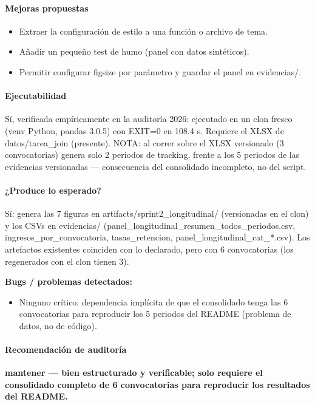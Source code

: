 \paragraph{Mejoras propuestas}
\begin{itemize}
  \item Extraer la configuración de estilo a una función o archivo de tema.
  \item Añadir un pequeño test de humo (panel con datos sintéticos).
  \item Permitir configurar figsize por parámetro y guardar el panel en evidencias/.
\end{itemize}

\paragraph{Ejecutabilidad}
Sí, verificada empíricamente en la auditoría 2026: ejecutado en un clon fresco (venv Python, pandas 3.0.5) con EXIT=0 en 108.4 s. Requiere el XLSX de datos/tarea\_join (presente). NOTA: al correr sobre el XLSX versionado (3 convocatorias) genera solo 2 periodos de tracking, frente a los 5 periodos de las evidencias versionadas --- consecuencia del consolidado incompleto, no del script.

\paragraph{¿Produce lo esperado?}
Sí: genera las 7 figuras en artifacts/sprint2\_longitudinal/ (versionadas en el clon) y los CSVs en evidencias/ (panel\_longitudinal\_resumen\_todos\_periodos.csv, ingresos\_por\_convocatoria, tasas\_retencion, panel\_longitudinal\_cat\_*.csv). Los artefactos existentes coinciden con lo declarado, pero con 6 convocatorias (los regenerados con el clon tienen 3).

\begin{tcolorbox}[riesgo]
\textbf{Bugs / problemas detectados:}
\begin{itemize}
  \item Ninguno crítico; dependencia implícita de que el consolidado tenga las 6 convocatorias para reproducir los 5 periodos del README (problema de datos, no de código).
\end{itemize}
\end{tcolorbox}

\paragraph{Recomendación de auditoría}
\textbf{mantener --- bien estructurado y verificable; solo requiere el consolidado completo de 6 convocatorias para reproducir los resultados del README.}

